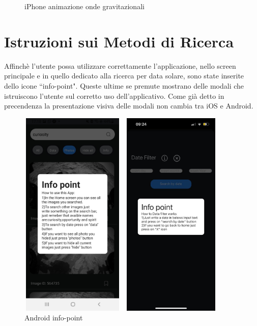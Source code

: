 \begin{figure}[H]
\begin{minipage}[h]{0.47\textwidth}
        \caption{\label{animazioneIphone} iPhone animazione onde gravitazionali}
    \end{minipage}
\end{figure}

\section*{Istruzioni sui Metodi di Ricerca}
Affinch\`e l'utente possa utilizzare correttamente l'applicazione, nello screen principale e in quello dedicato alla ricerca per data solare, sono state inserite dello icone ``info-point".
Queste ultime se premute mostrano delle modali che istruiscono l'utente sul corretto uso dell'applicativo. Come gi\`a detto in precendenza la presentazione visiva delle modali non cambia tra iOS e Android.
\begin{figure}[H]
    \begin{minipage}[h]{0.47\textwidth}
        \centering
        \includegraphics[width=5cm, height=10cm]{images/immaginiAndroid/infoPoint.jpg}
        \caption{\label{infoPointAndroid} Android info-point}
    \end{minipage}
    \hfill
    \begin{minipage}[h]{0.47\textwidth}
        \centering
        \includegraphics[width=5cm, height=10cm]{images/immaginiPhone/infoPoint.jpeg}

\end{minipage}
\end{figure}
